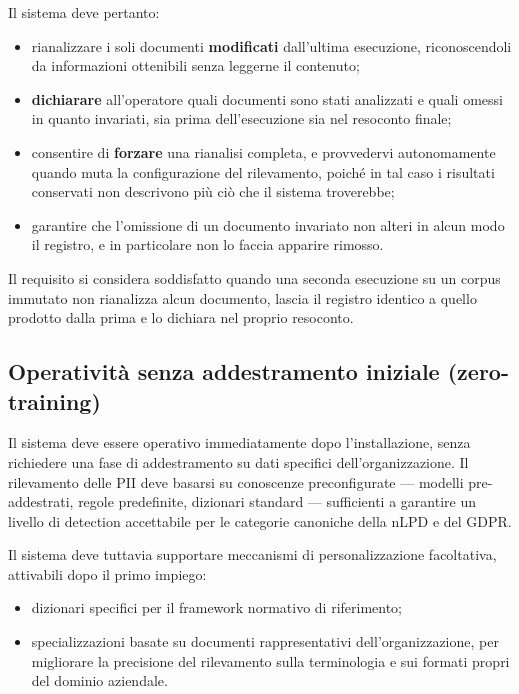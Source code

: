 Il sistema deve pertanto:
\begin{itemize}
	\item rianalizzare i soli documenti \textbf{modificati} dall'ultima esecuzione, riconoscendoli da informazioni ottenibili senza leggerne il contenuto;
	\item \textbf{dichiarare} all'operatore quali documenti sono stati analizzati e quali omessi in quanto invariati, sia prima dell'esecuzione sia nel resoconto finale;
	\item consentire di \textbf{forzare} una rianalisi completa, e provvedervi autonomamente quando muta la configurazione del rilevamento, poiché in tal caso i risultati conservati non descrivono più ciò che il sistema troverebbe;
	\item garantire che l'omissione di un documento invariato non alteri in alcun modo il registro, e in particolare non lo faccia apparire rimosso.
\end{itemize} \medskip

Il requisito si considera soddisfatto quando una seconda esecuzione su un corpus immutato non rianalizza alcun documento, lascia il registro identico a quello prodotto dalla prima e lo dichiara nel proprio resoconto.

\subsection{Operatività senza addestramento iniziale (zero-training)}
\label{sub:zero-training}
Il sistema deve essere operativo immediatamente dopo l'installazione, senza richiedere una fase di addestramento su dati specifici dell'organizzazione. Il rilevamento delle PII deve basarsi su conoscenze preconfigurate --- modelli pre-addestrati, regole predefinite, dizionari standard --- sufficienti a garantire un livello di detection accettabile per le categorie canoniche della nLPD e del GDPR. \medskip

Il sistema deve tuttavia supportare meccanismi di personalizzazione facoltativa, attivabili dopo il primo impiego:
\begin{itemize}
	\item dizionari specifici per il framework normativo di riferimento;
	\item specializzazioni basate su documenti rappresentativi dell'organizzazione, per migliorare la precisione del rilevamento sulla terminologia e sui formati propri del dominio aziendale.
\end{itemize}

